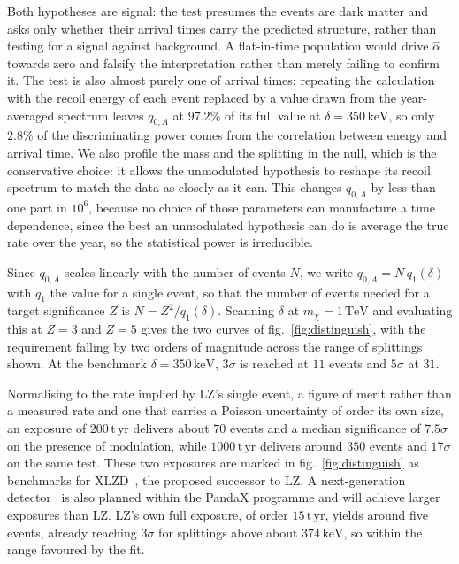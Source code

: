 \documentclass[aps,prl,twocolumn,superscriptaddress,nofootinbib,floatfix]{revtex4-2}
\newcommand{\keV}{\ensuremath{\,\mathrm{keV}}}
\newcommand{\TeV}{\ensuremath{\,\mathrm{TeV}}}
\newcommand{\tyr}{\ensuremath{\,\mathrm{t\,yr}}}
\newcommand{\mchi}{\ensuremath{m_\chi}}
\begin{document}
Both hypotheses are signal: the test presumes the events are dark matter and asks only whether their arrival times carry the predicted structure, rather than testing for a signal
against background. 
A flat-in-time population would drive $\hat\alpha$ towards zero and falsify the interpretation rather than merely failing to confirm it. 
The test is also almost purely one of arrival times: repeating the calculation with the recoil energy of each event replaced by a
value drawn from the year-averaged spectrum leaves $q_{0,A}$ at $97.2\%$ of its full value at $\delta = 350\keV$, so only $2.8\%$ of the discriminating power comes from the correlation
between energy and arrival time. We also profile the mass and the splitting in the null, which is the conservative choice: 
it allows the unmodulated hypothesis to reshape its recoil spectrum to match the data
as closely as it can. This changes $q_{0,A}$ by less than one part in $10^6$, because no choice of those parameters can manufacture a time dependence, since the best an unmodulated hypothesis can do is average the true rate over the year, so the statistical power is irreducible.

Since $q_{0,A}$ scales linearly with the number of events $N$, we write $q_{0,A} = N\, q_1(\delta)$ with $q_1$ the value for a single event, so that the number of events needed for a target significance $Z$ is $N = Z^2/q_1(\delta)$. 
Scanning $\delta$ at $\mchi = 1\TeV$ and evaluating this at $Z=3$ and $Z=5$ gives the two curves of fig.~\ref{fig:distinguish}, with the requirement falling by two orders of magnitude across the
range of splittings shown. 
At the benchmark $\delta = 350\keV$, $3\sigma$ is reached at $11$ events and $5\sigma$ at $31$.

Normalising to the rate implied by LZ's single event, a figure of merit rather than a measured rate and one that carries a Poisson uncertainty of order its own size, an exposure of
$200\tyr$ delivers about $70$ events and a median significance of $7.5\sigma$ on the presence of modulation, while $1000\tyr$ delivers around $350$ events and $17\sigma$ on the same test.
These two exposures are marked in fig.~\ref{fig:distinguish} as benchmarks for XLZD~\cite{XLZD:2024nsu}, the
proposed successor to LZ. A next-generation detector~\cite{PANDA-X:2024dlo} is also planned within the PandaX programme and will achieve larger exposures than LZ.
LZ's own full exposure, of order $15\tyr$, yields around five events, already reaching $3\sigma$ for splittings above about $374\keV$, so within the range favoured by the fit.
\end{document}
